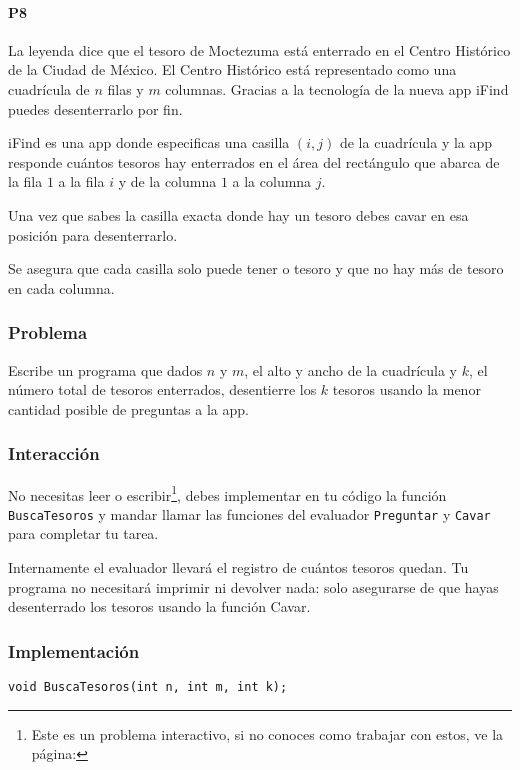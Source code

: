  

\problembreak

 \paragraph{P8} La leyenda dice que el tesoro de Moctezuma está enterrado en el Centro Histórico de la Ciudad de México. El Centro Histórico está representado como una cuadrícula de \(n\) filas y \(m\) columnas. Gracias a la tecnología de la nueva app iFind puedes desenterrarlo por fin.
 
 iFind es una app donde especificas una casilla \((i,j)\) de la cuadrícula y la app responde cuántos tesoros hay enterrados en el área del rectángulo que abarca de la fila \(1\) a la fila \(i\) y de la columna \(1\) a la columna \(j\).
 
 Una vez que sabes la casilla exacta donde hay un tesoro debes cavar en esa posición para desenterrarlo.
 
 Se asegura que cada casilla solo puede tener  o  tesoro y que no hay más de  tesoro en cada columna.
 
 \subsubsection*{Problema}
 Escribe un programa que dados \(n\) y \(m\), el alto y ancho de la cuadrícula y \(k\), el número total de tesoros enterrados, desentierre los \(k\) tesoros usando la menor cantidad posible de preguntas a la app.
 
 \subsubsection*{Interacción}
 No necesitas leer o escribir\footnote{Este es un problema interactivo, si no conoces como trabajar con estos, ve la página: \pageref{interactivos}}, debes implementar en tu código la función \verb|BuscaTesoros| y mandar llamar las funciones del evaluador \verb|Preguntar| y \verb|Cavar| para completar tu tarea.
 
 Internamente el evaluador llevará el registro de cuántos tesoros quedan. Tu programa no necesitará imprimir ni devolver nada: solo asegurarse de que hayas desenterrado los  tesoros usando la función Cavar.
 
\subsubsection*{Implementación}
\verb|void BuscaTesoros(int n, int m, int k);|

